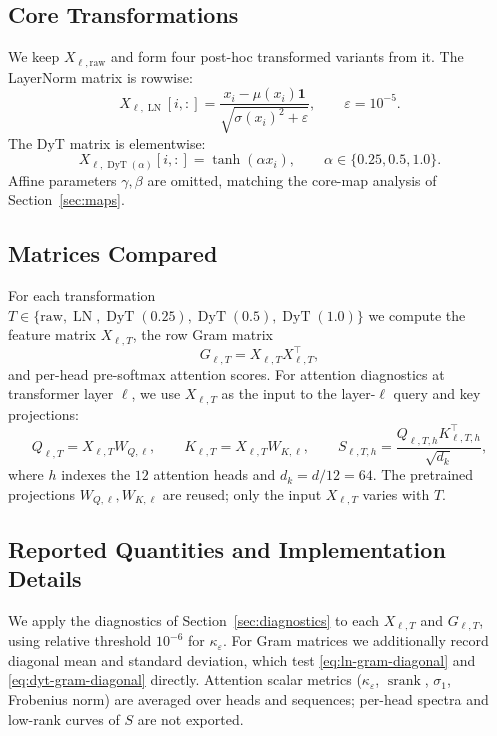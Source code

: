 \documentclass[11pt]{article}
\newcommand{\one}{\mathbf{1}}
\newcommand{\LN}{\operatorname{LN}}
\newcommand{\DyT}{\operatorname{DyT}}
\newcommand{\srank}{\operatorname{srank}}
\newcommand{\kappaeff}{\kappa_{\varepsilon}}
\begin{document}
\subsection{Core Transformations}

We keep $X_{\ell,\mathrm{raw}}$ and form four post-hoc transformed variants from it. The LayerNorm matrix is rowwise:
\begin{equation}
    X_{\ell,\LN}[i,:]
    =
    \frac{x_i-\mu(x_i)\one}{\sqrt{\sigma(x_i)^2+\varepsilon}},
    \qquad \varepsilon=10^{-5}.
\label{eq:experiment-ln}
\end{equation}
The DyT matrix is elementwise:
\begin{equation}
    X_{\ell,\DyT(\alpha)}[i,:]
    =
    \tanh(\alpha x_i),
    \qquad \alpha\in\{0.25,0.5,1.0\}.
\label{eq:experiment-dyt}
\end{equation}
Affine parameters $\gamma,\beta$ are omitted, matching the core-map analysis of Section~\ref{sec:maps}.

\subsection{Matrices Compared}

For each transformation $T\in\{\mathrm{raw},\LN,\DyT(0.25),\DyT(0.5),\DyT(1.0)\}$ we compute the feature matrix $X_{\ell,T}$, the row Gram matrix
\begin{equation}
    G_{\ell,T}=X_{\ell,T}X_{\ell,T}^\top,
\label{eq:experiment-gram}
\end{equation}
and per-head pre-softmax attention scores. For attention diagnostics at transformer layer $\ell$, we use $X_{\ell,T}$ as the input to the layer-$\ell$ query and key projections:
\begin{equation}
    Q_{\ell,T}=X_{\ell,T}W_{Q,\ell},
    \qquad
    K_{\ell,T}=X_{\ell,T}W_{K,\ell},
    \qquad
    S_{\ell,T,h}=\frac{Q_{\ell,T,h}K_{\ell,T,h}^\top}{\sqrt{d_k}},
\label{eq:experiment-qk}
\end{equation}
where $h$ indexes the $12$ attention heads and $d_k=d/12=64$. The pretrained projections $W_{Q,\ell},W_{K,\ell}$ are reused; only the input $X_{\ell,T}$ varies with $T$.

\subsection{Reported Quantities and Implementation Details}

We apply the diagnostics of Section~\ref{sec:diagnostics} to each $X_{\ell,T}$ and $G_{\ell,T}$, using relative threshold $10^{-6}$ for $\kappaeff$. For Gram matrices we additionally record diagonal mean and standard deviation, which test \eqref{eq:ln-gram-diagonal} and \eqref{eq:dyt-gram-diagonal} directly. Attention scalar metrics ($\kappaeff$, $\srank$, $\sigma_1$, Frobenius norm) are averaged over heads and sequences; per-head spectra and low-rank curves of $S$ are not exported.
\end{document}
